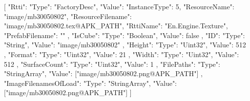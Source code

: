 [{
        "Rtti": {
            "Type": "FactoryDesc",
            "Value": {
                "InstanceType": 5,
                "ResourceName": "image/mb30050802",
                "ResourceFilename": "image/mb30050802.tex@APK_PATH",
                "RttiName": "En.Engine.Texture",
                "PrefabFilename": ""
            }
        },
        "IsCube": {
            "Type": "Boolean",
            "Value": false
        },
        "ID": {
            "Type": "String",
            "Value": "image/mb30050802"
        },
        "Height": {
            "Type": "Uint32",
            "Value": 512
        },
        "Format": {
            "Type": "Uint32",
            "Value": 21
        },
        "Width": {
            "Type": "Uint32",
            "Value": 512
        },
        "SurfaceCount": {
            "Type": "Uint32",
            "Value": 1
        },
        "FilePaths": {
            "Type": "StringArray",
            "Value": ["image/mb30050802.png@APK_PATH"]
        },
        "ImageFilenamesOfLoad": {
            "Type": "StringArray",
            "Value": ["image/mb30050802.png@APK_PATH"]
        }
    }]